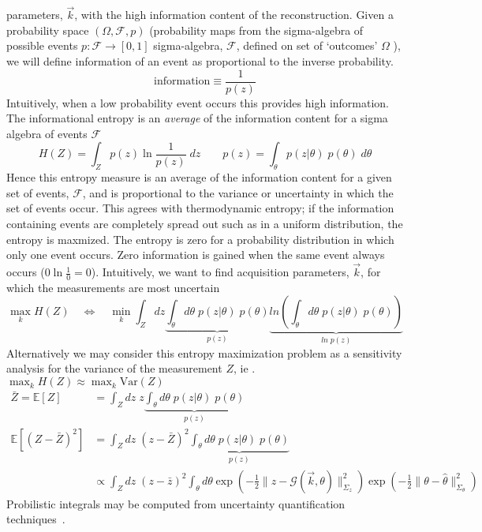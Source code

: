 \documentclass{article}         %
\theoremstyle{definition}
\theoremstyle{remark}
\begin{document}
\begin{enumerate}
parameters, $\vec{k}$, with the high information content of the reconstruction.
Given a probability space 
$(\Omega, \mathcal{F},p)$ (probability maps from the
sigma-algebra of possible events $p:\mathcal{F}\rightarrow [0,1]$
sigma-algebra, $\mathcal{F}$, defined on set of `outcomes' $\Omega$
\cite{durrett2010probability}),
we will define information of an event  as
proportional to the inverse probability.
\[
\text{information} \equiv  \frac{1}{p(z)}
\]
Intuitively, when a low probability event occurs this provides high
information.
The informational entropy is an \textit{average}
of the information content for a sigma algebra of events $\mathcal{F}$
\[
H(Z) = \int_Z  p(z) \ln\frac{1}{p(z)} \; dz
\qquad
  p(z) = \int_\theta p(z|\theta) \; p(\theta)\; d\theta 
\]
Hence this entropy measure is an average of the information content
for a given set of events, $\mathcal{F}$, and is proportional to the
variance or uncertainty in which the set of events occur.
This agrees with thermodynamic entropy;
if the information containing events are completely spread out such as in a
uniform distribution, the entropy is maxmized.
The entropy
is zero for a probability distribution in which
only one event occurs. Zero information is gained when the same event
always occurs ($0 \ln\frac{1}{0} = 0$). 
Intuitively, we want to find acquisition parameters,
$\vec{k}$, for which the measurements are most uncertain
\[
\max_k H(Z)
  \quad \Leftrightarrow \quad
\min_k 
    \int_Z   dz \underbrace{\int_\theta  d\theta \; p(z|\theta) \; p(\theta)}_{p(z)}
                \underbrace{ln \left(\int_\theta  d\theta \; p(z|\theta) \; p(\theta)\right)}_{ln \; p(z)}
\]
Alternatively we may consider this entropy maximization problem as a
sensitivity analysis for the variance of the measurement $Z$, ie . 
$ \max_k H(Z) \approx  \max_k \text{Var}(Z) $
\[ \begin{split}
   \bar{Z} = \mathbb{E}[Z]  & = \int_Z   dz \; z
   \underbrace{\int_\theta  d\theta \; p(z|\theta) \; p(\theta)}_{p(z)}
  \\
   \mathbb{E}[ ( Z - \bar{Z} )^2 ]  & = \int_Z   dz \;(z - \bar{Z})^2 
   \underbrace{\int_\theta  d\theta \; p(z|\theta) \; p(\theta)}_{p(z)}
  \\
   &  \propto
    \int_Z   dz \;(z - \bar{z})^2 \int_\theta  d\theta 
 \exp\left( - \frac{1}{2} \|  z- \mathcal{G}(\vec{k},\theta)  \|^2_{\Sigma_z}\right)
 \exp\left( - \frac{1}{2} \|  \theta - \hat{\theta}  \|^2_{\Sigma_\theta}\right)
 \end{split}
\]
Probilistic integrals may be
computed from uncertainty quantification
techniques~\cite{fahrenholtz2013generalised}.

 

\end{enumerate}
\end{document}
